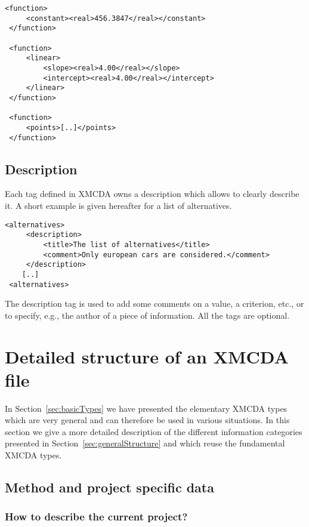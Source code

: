 \documentclass[a4paper,oneside,10 pt]{article}
\newcommand{\XMCDA}{{\asciifamily XMCDA}\xspace}
\newcommand{\code}{\asciifamily}
\begin{document}
{\code
\begin{lstlisting}[style=prototype]
 <function>
	 <constant><real>456.3847</real></constant>
 </function>

 <function>
	 <linear>
		 <slope><real>4.00</real></slope>
		 <intercept><real>4.00</real></intercept>
	 </linear>
 </function>

 <function>
	 <points>[..]</points>
 </function>
\end{lstlisting}
}

\subsection{Description}

Each tag defined in {\code XMCDA} owns a description which allows to clearly describe it. A short example is given hereafter for a list of alternatives. 
{\code
\begin{lstlisting}[style=prototype]
 <alternatives>
	 <description>
		 <title>The list of alternatives</title>
		 <comment>Only european cars are considered.</comment>
	 </description>
	[..]
 <alternatives>
\end{lstlisting}
}
The description tag is used to add some comments on a value, a criterion, etc., or to specify, e.g., the author of a piece of information. All the tags are optional. 




\section{Detailed structure of an \XMCDA file}\label{sec:additionalTypes}

In Section~\ref{sec:basicTypes} we have presented the elementary \XMCDA types which are very general and can therefore be used in various situations. 
In this section we give a more detailed description of the different information categories presented in Section~\ref{sec:generalStructure} and which reuse the fundamental \XMCDA types.

\subsection{Method and project specific data}

\subsubsection{How to describe the current project?}
\end{document}
